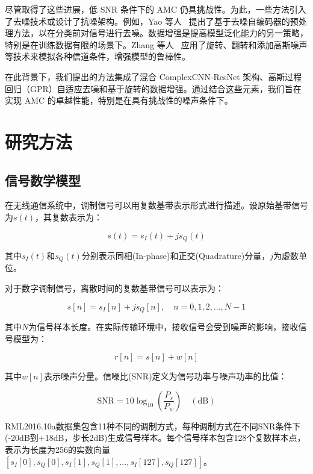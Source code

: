 \documentclass[conference]{IEEEtran}
\begin{document}
尽管取得了这些进展，低 SNR 条件下的 AMC 仍具挑战性。为此，一些方法引入了去噪技术或设计了抗噪架构。例如，Yao 等人~\cite{yao2019modulation} 提出了基于去噪自编码器的预处理方法，以在分类前对信号进行去噪。数据增强是提高模型泛化能力的另一策略，特别是在训练数据有限的场景下。Zhang 等人~\cite{zhang2023efficient} 应用了旋转、翻转和添加高斯噪声等技术来模拟各种信道条件，增强模型的鲁棒性。

在此背景下，我们提出的方法集成了混合 ComplexCNN-ResNet 架构、高斯过程回归（GPR）自适应去噪和基于旋转的数据增强。通过结合这些元素，我们旨在实现 AMC 的卓越性能，特别是在具有挑战性的噪声条件下。


\section{研究方法}

\subsection{信号数学模型}

在无线通信系统中，调制信号可以用复数基带表示形式进行描述。设原始基带信号为$s(t)$，其复数表示为：

\begin{equation}
s(t) = s_I(t) + js_Q(t)
\end{equation}

其中$s_I(t)$和$s_Q(t)$分别表示同相(In-phase)和正交(Quadrature)分量，$j$为虚数单位。

对于数字调制信号，离散时间的复数基带信号可以表示为：

\begin{equation}
s[n] = s_I[n] + js_Q[n], \quad n = 0, 1, 2, ..., N-1
\end{equation}

其中$N$为信号样本长度。在实际传输环境中，接收信号会受到噪声的影响，接收信号模型为：

\begin{equation}
r[n] = s[n] + w[n]
\end{equation}

其中$w[n]$表示噪声分量。信噪比(SNR)定义为信号功率与噪声功率的比值：

\begin{equation}
\mathrm{SNR} = 10\log_{10}\left(\frac{P_s}{P_w}\right) \quad(\mathrm{dB})
\end{equation}


RML2016.10a数据集包含11种不同的调制方式，每种调制方式在不同SNR条件下(-20dB到+18dB，步长2dB)生成信号样本。每个信号样本包含128个复数样本点，表示为长度为256的实数向量$[s_I[0], s_Q[0], s_I[1], s_Q[1], ..., s_I[127], s_Q[127]]$。
\end{document}
